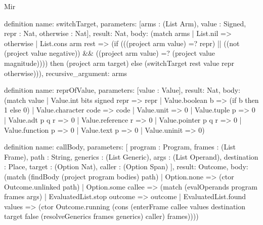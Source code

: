 \begin{lexlean}{Mir}
\begin{semanticmodule}
definition{
  name: switchTarget,
  parameters: [arms : (List Arm), value : Signed, repr : Nat, otherwise : Nat],
  result: Nat,
  body: (match arms
    | List.nil => otherwise
    | List.cons arm rest => (if (((project arm value) =? repr) || ((not (project value negative)) && ((project arm value) =? (project value magnitude)))) then (project arm target) else (switchTarget rest value repr otherwise))),
  recursive_argument: arms
}

definition{
  name: reprOfValue,
  parameters: [value : Value],
  result: Nat,
  body: (match value
    | Value.int bits signed repr => repr
    | Value.boolean b => (if b then 1 else 0)
    | Value.character code => code
    | Value.unit => 0
    | Value.tuple p => 0
    | Value.adt p q r => 0
    | Value.reference r => 0
    | Value.pointer p q r => 0
    | Value.function p => 0
    | Value.text p => 0
    | Value.uninit => 0)
}

definition{
  name: callBody,
  parameters: [
    program : Program,
    frames : (List Frame),
    path : String,
    generics : (List Generic),
    args : (List Operand),
    destination : Place,
    target : (Option Nat),
    caller : (Option Span)
  ],
  result: Outcome,
  body: (match (findBody (project program bodies) path)
    | Option.none => (ctor Outcome.unlinked path)
    | Option.some callee => (match (evalOperands program frames args)
      | EvaluatedList.stop outcome => outcome
      | EvaluatedList.found values => (ctor Outcome.running (cons (enterFrame callee values destination target false (resolveGenerics frames generics) caller) frames))))
}


\end{semanticmodule}
\end{lexlean}
